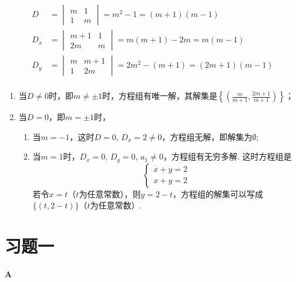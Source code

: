 \begin{solution}
\[\begin{split}
D&=\begin{vmatrix}
  m&1\\1&m
\end{vmatrix}=m^2-1=(m+1)(m-1)\\
D_x&=\begin{vmatrix}
  m+1&1\\2m&m
\end{vmatrix}=m(m+1)-2m=m(m-1)\\
D_y&=\begin{vmatrix}
  m&m+1\\1&2m
\end{vmatrix}=2m^2-(m+1)=(2m+1)(m-1)\\
\end{split}\]
\begin{enumerate}
  \item 当$D\ne 0$时，即$m\ne\pm 1$时，方程组有唯一解，其解集是$\left\{\left(\frac{m}{m+1},\frac{2m+1}{m+1}\right)\right\}$；
  \item 当$D=0$，即$m=\pm 1$时，
\begin{enumerate}[(1)]
  \item 当$m=-1$，这时$D=0$, $D_x=2\ne 0$，方程组无解，即解集为$\emptyset$;
  \item 当$m=1$时，$D_x=0$, $D_y=0$, $a_1\ne 0$，方程组有无穷多解. 这时方程组是
\[\begin{cases}
  x+y=2\\
  x+y=2  
\end{cases}\]
  若令$x=t$（$t$为任意常数），则$y=2-t$，方程组的解集可以写成$\{(t,2-t)\}$（$t$为任意常数）.
\end{enumerate}
\end{enumerate}
\end{solution}

\section*{习题一}
\begin{center}
  \bfseries A
\end{center}

